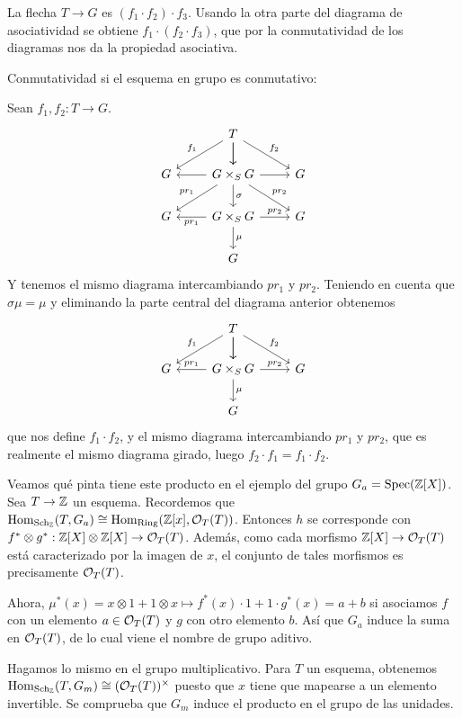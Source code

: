 \documentclass[GA.tex]{subfiles}
\begin{document}
\begin{dem}
La flecha $T\to G$ es $(f_1\cdot f_2)\cdot f_3$. Usando la otra parte del diagrama de asociatividad se obtiene $f_1\cdot (f_2\cdot f_3)$, que por la conmutatividad de los diagramas nos da la propiedad asociativa. 

Conmutatividad si el esquema en grupo es conmutativo:

Sean $f_1,f_2:T\to G$. 
\[
\begin{tikzcd}
 & T \arrow[rd, "f_2"] \arrow[d] \arrow[ld, "f_1"'] \arrow[d] &  \\
G & G\times_S G \arrow[l] \arrow[r] \arrow[d, "\sigma"] \arrow[ld, "pr_1"'] \arrow[rd, "pr_2"] & G \\
G & G\times_S G \arrow[l, "pr_1"] \arrow[r, "pr_2"] \arrow[d, "\mu"] & G \\
 & G & 
\end{tikzcd}
\]
Y tenemos el mismo diagrama intercambiando $pr_1$ y $pr_2$. Teniendo en cuenta que $\sigma\mu=\mu$ y eliminando la parte central del diagrama anterior obtenemos
 \[
\begin{tikzcd}
 & T \arrow[rd, "f_2"] \arrow[d] \arrow[ld, "f_1"'] \arrow[d] &  \\
G & G\times_S G \arrow[l, "pr_1"'] \arrow[r, "pr_2"] \arrow[d, "\mu"] & G \\
 & G & 
\end{tikzcd}
\]
que nos define $f_1\cdot f_2$, y el mismo diagrama intercambiando $pr_1$ y $pr_2$, que es realmente el mismo diagrama girado, luego $f_2\cdot f_1=f_1\cdot f_2$. 
\end{dem}


\begin{ej}
Veamos qué pinta tiene este producto en el ejemplo del grupo $G_a=\operatorname{Spec}(\mathbb{Z}[X])$. Sea $T\to\mathbb{Z}$ un esquema. Recordemos que $\operatorname{Hom}_{\operatorname{Sch}_{\mathbb{Z}}}(T,G_a)\cong\operatorname{Hom}_{\operatorname{Ring}}(\mathbb{Z}[x],{\mathcal O}_T(T))$. Entonces $h$ se corresponde con $f^*\otimes g^*:\mathbb{Z}[X]\otimes\mathbb{Z}[X]\to{\mathcal O}_T(T)$. Además, como cada morfismo $\mathbb{Z}[X]\to{\mathcal O}_T(T)$ está caracterizado por la imagen de $x$, el conjunto de tales morfismos es precisamente ${\mathcal O}_T(T)$. 

Ahora, $\mu^*(x)=x\otimes 1+1\otimes x\mapsto f^*(x)\cdot 1+1\cdot g^*(x)=a+b$ si asociamos $f$ con un elemento $a\in{\mathcal O}_T(T)$ y $g$ con otro elemento $b$. Así que $G_a$ induce la suma en ${\mathcal O}_T(T)$, de lo cual viene el nombre de grupo aditivo. 
\end{ej}

\begin{ej}
Hagamos lo mismo en el grupo multiplicativo. Para $T$ un esquema, obtenemos $\operatorname{Hom}_{\operatorname{Sch}_{\mathbb{Z}}}(T,G_m)\cong({\mathcal O}_T(T))^\times$ puesto que $x$ tiene que mapearse a un elemento invertible. Se comprueba que $G_m$ induce el producto en el grupo de las unidades. 
\end{ej}
\end{document}
